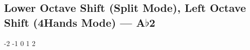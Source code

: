 \subsection[Lower Octave Shift (Split Mode), Left Octave Shift (4Hands  Mode)]{Lower Octave Shift (Split Mode), Left Octave Shift (4Hands  Mode) --- \UiKey{\SET}A$\flat$2}







































-2
-1
0
1
2
